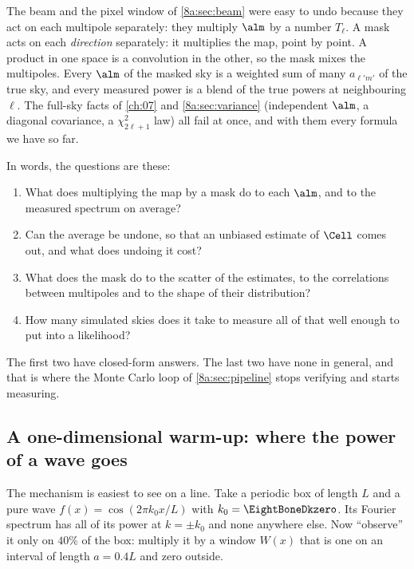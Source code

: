 The beam and the pixel window of \cref{8a:sec:beam} were easy to undo because they act on
each multipole separately: they multiply $\alm$ by a number $T_\ell$. A mask acts on each
\emph{direction} separately: it multiplies the map, point by point. A product in one space is
a convolution in the other, so the mask mixes the multipoles. Every $\alm$ of the masked sky
is a weighted sum of many $a_{\ell'm'}$ of the true sky, and every measured power is a blend of
the true powers at neighbouring $\ell$. The full-sky facts of \cref{ch:07} and \cref{8a:sec:variance}
(independent $\alm$, a diagonal covariance, a $\chi^2_{2\ell+1}$ law) all fail at once, and with
them every formula we have so far.

In words, the questions are these:
\begin{enumerate}
  \item What does multiplying the map by a mask do to each $\alm$, and to the measured
        spectrum on average?
  \item Can the average be undone, so that an unbiased estimate of $\Cell$ comes out, and what
        does undoing it cost?
  \item What does the mask do to the scatter of the estimates, to the correlations between
        multipoles and to the shape of their distribution?
  \item How many simulated skies does it take to measure all of that well enough to put into
        a likelihood?
\end{enumerate}
The first two have closed-form answers. The last two have none in general, and that is
where the Monte Carlo loop of \cref{8a:sec:pipeline} stops verifying and starts measuring.

\subsection{A one-dimensional warm-up: where the power of a wave goes}
\label{8b:sec:leakage}

The mechanism is easiest to see on a line. Take a periodic box of length $L$ and a pure wave
$f(x)=\cos(2\pi k_0x/L)$ with $k_0=\EightBoneDkzero$. Its Fourier spectrum has all of its power
at $k=\pm k_0$ and none anywhere else. Now ``observe'' it only on $40\%$ of the box: multiply
it by a window $W(x)$ that is one on an interval of length $a=0.4L$ and zero outside.

